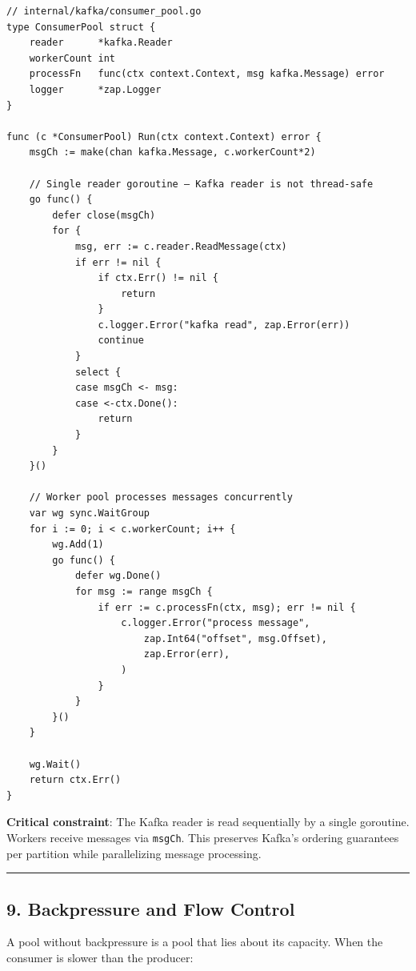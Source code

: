 \documentclass[11pt,a4paper,oneside]{book}
\begin{document}
\begin{verbatim}
// internal/kafka/consumer_pool.go
type ConsumerPool struct {
    reader      *kafka.Reader
    workerCount int
    processFn   func(ctx context.Context, msg kafka.Message) error
    logger      *zap.Logger
}

func (c *ConsumerPool) Run(ctx context.Context) error {
    msgCh := make(chan kafka.Message, c.workerCount*2)

    // Single reader goroutine — Kafka reader is not thread-safe
    go func() {
        defer close(msgCh)
        for {
            msg, err := c.reader.ReadMessage(ctx)
            if err != nil {
                if ctx.Err() != nil {
                    return
                }
                c.logger.Error("kafka read", zap.Error(err))
                continue
            }
            select {
            case msgCh <- msg:
            case <-ctx.Done():
                return
            }
        }
    }()

    // Worker pool processes messages concurrently
    var wg sync.WaitGroup
    for i := 0; i < c.workerCount; i++ {
        wg.Add(1)
        go func() {
            defer wg.Done()
            for msg := range msgCh {
                if err := c.processFn(ctx, msg); err != nil {
                    c.logger.Error("process message",
                        zap.Int64("offset", msg.Offset),
                        zap.Error(err),
                    )
                }
            }
        }()
    }

    wg.Wait()
    return ctx.Err()
}
\end{verbatim}

\textbf{Critical constraint}: The Kafka reader is read sequentially by a
single goroutine. Workers receive messages via \texttt{msgCh}. This
preserves Kafka's ordering guarantees per partition while parallelizing
message processing.

\begin{center}\rule{0.5\linewidth}{0.5pt}\end{center}

\subsection{9. Backpressure and Flow
Control}

A pool without backpressure is a pool that lies about its capacity. When
the consumer is slower than the producer:
\end{document}
